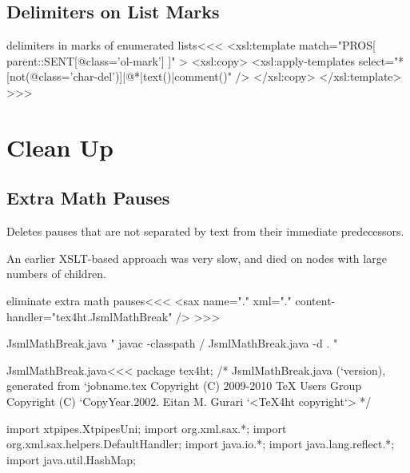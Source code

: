 \documentclass{article}
\begin{document}
\subsection{Delimiters on List Marks}



\<delimiters in marks of enumerated lists\><<<
<xsl:template match="PROS[  parent::SENT[@class='ol-mark'] ]" >
   <xsl:copy>
      <xsl:apply-templates 
           select="*[not(@class='char-del')]|@*|text()|comment()" />  
   </xsl:copy>
</xsl:template> 
>>>


\section{Clean Up}


\subsection{Extra Math Pauses}


Deletes pauses that are not separated by text from their immediate
predecessors. 

An earlier XSLT-based approach was very slow, and died
on nodes with large numbers of children.


\<eliminate extra math pauses\><<<
<sax name="." xml="." content-handler="tex4ht.JsmlMathBreak" />
>>>

\AtEndDocument%
{
  \OutputCodE\<JsmlMathBreak.java\>
}
\Needs%
{"
    javac -classpath \XTPIPES/ JsmlMathBreak.java -d \XTPIPES.
"}
 
\<JsmlMathBreak.java\><<< 
package tex4ht;
/* JsmlMathBreak.java (`version), generated from `jobname.tex
   Copyright (C) 2009-2010 TeX Users Group
   Copyright (C) `CopyYear.2002. Eitan M. Gurari
`<TeX4ht copyright`> */

import xtpipes.XtpipesUni;
import org.xml.sax.*;
import org.xml.sax.helpers.DefaultHandler;
import java.io.*;
import java.lang.reflect.*;
import java.util.HashMap;
\end{document}
